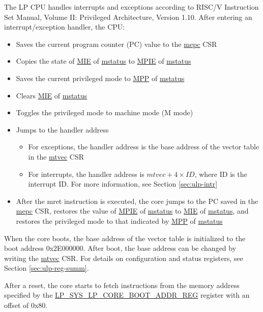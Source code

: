 \documentclass[main\_\_EN.tex]{subfiles}
\begin{document}
The LP CPU handles interrupts and exceptions according to RISC\-/V Instruction Set Manual, Volume II: Privileged Architecture, Version 1.10. After entering an interrupt/exception handler, the CPU:
\begin{itemize}
    \item Saves the current program counter (PC) value to the \hyperref[regdesc:LPMEPC]{mepc} CSR
    \item Copies the state of \hyperref[fielddesc:LPMSTATUSMIE]{MIE} of \hyperref[regdesc:LPMSTATUS]{mstatus} to \hyperref[fielddesc:LPMSTATUSMPIE]{MPIE} of \hyperref[regdesc:LPMSTATUS]{mstatus}
    \item Saves the current privileged mode to \hyperref[fielddesc:LPMSTATUSMPP]{MPP} of \hyperref[regdesc:LPMSTATUS]{mstatus}
    \item Clears \hyperref[fielddesc:LPMSTATUSMIE]{MIE} of \hyperref[regdesc:LPMSTATUS]{mstatus}
    \item Toggles the privileged mode to machine mode (M mode)
    \item Jumps to the handler address
        \begin{itemize}
            \item For exceptions, the handler address is the base address of the vector table in the \hyperref[regdesc:LPMTVEC]{mtvec} CSR
            \item For interrupts, the handler address is $\hyperref[regdesc:LPMTVEC]{mtvec} + 4 \times ID$, where ID is the interrupt ID. For more information, see Section \ref{sec:ulp-intr}
        \end{itemize}
    \item After the mret instruction is executed, the core jumps to the PC saved in the \hyperref[regdesc:LPMEPC]{mepc} CSR, restores the value of \hyperref[fielddesc:LPMSTATUSMPIE]{MPIE} of \hyperref[regdesc:LPMSTATUS]{mstatus} to \hyperref[fielddesc:LPMSTATUSMIE]{MIE} of \hyperref[regdesc:LPMSTATUS]{mstatus}, and restores the privileged mode to that indicated by \hyperref[fielddesc:LPMSTATUSMPP]{MPP} of \hyperref[regdesc:LPMSTATUS]{mstatus}
\end{itemize}

When the core boots, the base address of the vector table is initialized to the boot address 0x2E000000. After boot, the base address can be changed by writing the \hyperref[regdesc:LPMTVEC]{mtvec} CSR. For details on configuration and status registers, see Section \ref{sec:ulp-reg-summ}.

After a reset, the core starts to fetch instructions from the memory address specified by the \hyperref[regdesc:LPSYSREGLPCOREBOOTADDRREG]{LP\_SYS\_LP\_CORE\_BOOT\_ADDR\_REG} register with an offset of 0x80.
\end{document}
